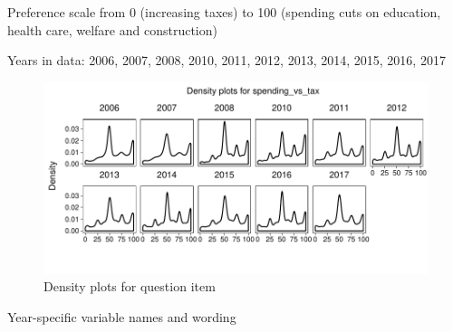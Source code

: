 \documentclass[12pt]{article}
\begin{document}
Preference scale from 0 (increasing taxes) to 100 (spending cuts on
education, health care, welfare and construction)

Years in data: 2006, 2007, 2008, 2010, 2011, 2012, 2013, 2014, 2015,
2016, 2017

\begin{figure}

{\centering \includegraphics{CCES_Cumulative_Preferences_2006-2019_guide_files/figure-latex/unnamed-chunk-4-1} 

}

\caption{Density plots for question item}\label{fig:unnamed-chunk-4-1}
\end{figure}

Year-specific variable names and wording
\end{document}
